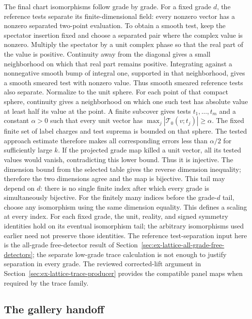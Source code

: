 The final chart isomorphisms follow grade by grade. For a fixed grade $d$,
the reference tests separate its finite-dimensional field: every nonzero
vector has a nonzero separated two-point evaluation. To obtain a smooth
test, keep the spectator insertion fixed and choose a separated pair where
the complex value is nonzero. Multiply the spectator by a unit complex
phase so that the real part of the value is positive. Continuity away from
the diagonal gives a small neighborhood on which that real part remains
positive. Integrating against a nonnegative smooth bump of integral one,
supported in that neighborhood, gives a smooth smeared test with nonzero
value. Thus smooth smeared reference tests also separate. Normalize to the
unit sphere. For
each point of that compact sphere, continuity gives a neighborhood on
which one such test has absolute value at least half its value at the
point. A finite subcover gives tests $t_1,\ldots,t_m$ and a constant
$\alpha>0$ such that every unit vector has
$\max_j|\mathcal T_0(v;t_j)|\geq\alpha$. The fixed finite set of
label charges and test suprema is bounded on that sphere. The tested
approach estimate therefore makes all corresponding errors less than
$\alpha/2$ for sufficiently large $k$. If the projected grade map killed a
unit vector, all its tested values would vanish, contradicting this lower
bound. Thus it is injective. The dimension bound from the selected table gives the reverse
dimension inequality; therefore the two dimensions agree and the map is
bijective. This tail may depend on $d$: there is no single finite index
after which every grade is simultaneously bijective. For the finitely many
indices before the grade-$d$ tail, choose any isomorphism using the same
dimension equality. This defines a scaling at every index. For each fixed
grade, the unit, reality, and signed symmetry identities hold on its
eventual isomorphism tail; the arbitrary isomorphisms used earlier need not
preserve those identities. The reference test-separation input here is the
all-grade free-detector result of
Section~\ref{sec:ex-lattice-all-grade-free-detectors}; the separate
low-grade trace calculation is not enough to justify separation in every
grade. The reviewed corrected-lift argument in
Section~\ref{sec:ex-lattice-trace-producer}
provides the compatible panel maps when required by the trace family.

\subsection{The gallery handoff}

